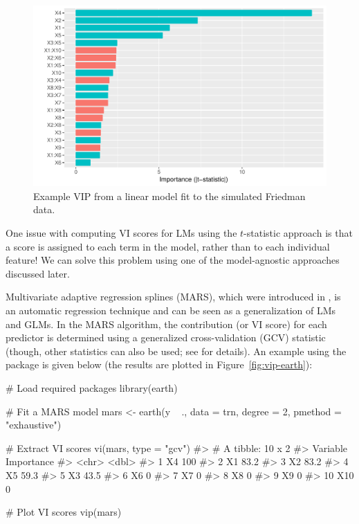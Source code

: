 \begin{figure}[!htb]
  \centering 
  \includegraphics[width=1\linewidth]{figures/vip-step} 
  \caption{Example VIP from a linear model fit to the simulated Friedman data.}
  \label{fig:vip-step}
\end{figure}

One issue with computing VI scores for LMs using the $t$-statistic approach is that a score is assigned to each term in the model, rather than to each individual feature! We can solve this problem using one of the model-agnostic approaches discussed later.

Multivariate adaptive regression splines (MARS), which were introduced in \citet{multivariate-friedman-1991}, is an automatic regression technique and can be seen as a generalization of LMs and GLMs. In the MARS algorithm, the contribution (or VI score) for each predictor is determined using a generalized cross-validation (GCV) statistic (though, other statistics can also be used; see  for details). An example using the  package \citep{earth-pkg} is given below (the results are plotted in Figure~\ref{fig:vip-earth}):

\begin{example}
# Load required packages
library(earth)

# Fit a MARS model
mars <- earth(y ~ ., data = trn, degree = 2, pmethod = "exhaustive")

# Extract VI scores
vi(mars, type = "gcv")
#> # A tibble: 10 x 2
#>    Variable Importance
#>    <chr>         <dbl>
#>  1 X4            100  
#>  2 X1             83.2
#>  3 X2             83.2
#>  4 X5             59.3
#>  5 X3             43.5
#>  6 X6              0  
#>  7 X7              0  
#>  8 X8              0  
#>  9 X9              0  
#> 10 X10             0

# Plot VI scores
vip(mars)
\end{example}

